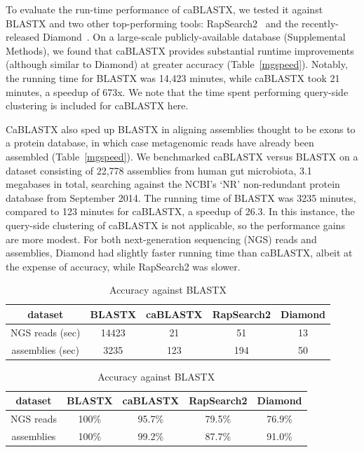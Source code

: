 \documentclass[review,preprint,12pt]{elsarticle}
\renewcommand{\cite}{\citep} %
\theoremstyle{definition}
\theoremstyle{remark}
\numberwithin{equation}{section}
\begin{document}
To evaluate the run-time performance of caBLASTX, we tested it against
BLASTX and two other top-performing tools: RapSearch2~\cite{zhao2012rapsearch2} and the recently-released
Diamond~\cite{buchfink2014fast}.
On a large-scale publicly-available database (Supplemental Methods), we found that caBLASTX provides substantial runtime improvements 
(although similar to Diamond) at greater accuracy (Table~\ref{mgspeed}).
Notably, the running time for BLASTX was 14,423 minutes, 
while caBLASTX took 21 minutes, a speedup of 673x.
We note that the time spent performing query-side clustering is included for caBLASTX here.

CaBLASTX also sped up BLASTX in aligning assemblies thought to be exons to a protein
database, in which case metagenomic reads have already been 
assembled (Table~\ref{mgspeed}).
We benchmarked caBLASTX versus BLASTX on a dataset consisting of 22,778 assemblies
from human gut microbiota, 3.1 megabases in total, searching against the NCBI's
`NR' non-redundant protein database from September 2014.
The running time of BLASTX was 3235 minutes, compared to 123 minutes for 
caBLASTX, a speedup of 26.3.
In this instance, the query-side clustering of caBLASTX is not applicable, so
the performance gains are more modest.
For both next-generation sequencing (NGS) reads and assemblies, Diamond had slightly faster running time than caBLASTX, albeit at the expense of accuracy, while RapSearch2 was slower.

\begin{table}
\caption{(a) Running time and (b) accuracy of BLASTX, caBLASTX, RapSearch2, and Diamond}
\begin{subtable}{1\textwidth}
\caption{Running time}
\label{mgspeed}
\begin{tabular}{ccccc}
\hline
dataset & BLASTX & caBLASTX & RapSearch2 & Diamond \\
\hline
NGS reads (sec) & 14423 & 21 & 51 & 13 \\
\hline
assemblies (sec) & 3235 & 123 & 194 & 50 \\
\hline
\end{tabular}
\end{subtable}

\begin{subtable}{1\textwidth}
\caption{Accuracy against BLASTX}
\label{mgacc}
\begin{tabular}{ccccc}
\hline
dataset & BLASTX & caBLASTX & RapSearch2 & Diamond \\
\hline
NGS reads & 100\% & 95.7\% & 79.5\% & 76.9\% \\
\hline
assemblies & 100\% & 99.2\% & 87.7\% & 91.0\% \\
\hline
\end{tabular}
\end{subtable}
\end{table}
\end{document}
